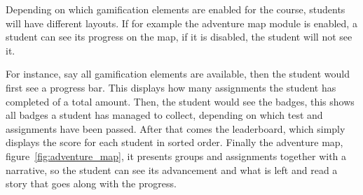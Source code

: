 Depending on which gamification elements are enabled for the course, students will have different layouts. If for example the adventure map module is enabled, a student can see its progress on the map, if it is disabled, the student will not see it.

For instance, say all gamification elements are available, then the student would first see a progress bar. This displays how many assignments the student has completed of a total amount. Then, the student would see the badges, this shows all badges a student has managed to collect, depending on which test and assignments have been passed. After that comes the leaderboard, which simply displays the score for each student in sorted order. Finally the adventure map, figure~\ref{fig:adventure_map}, it presents groups and assignments together with a narrative, so the student can see its advancement and what is left and read a story that goes along with the progress.
